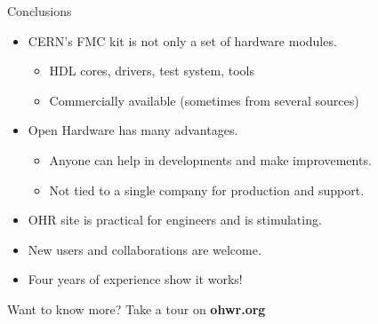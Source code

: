\documentclass[compress,red]{beamer}
\begin{document}
\begin{frame}{Conclusions}

  \begin{block}{}
    \begin{itemize}
    \item CERN's FMC kit is not only a set of hardware modules.
      \begin{itemize}
      \item HDL cores, drivers, test system, tools
      \item Commercially available (sometimes from several sources)
      \end{itemize}
    \item Open Hardware has many advantages.
      \begin{itemize}
      \item Anyone can help in developments and make improvements.
      \item Not tied to a single company for production and support.
      \end{itemize}
    \item OHR site is practical for engineers and is stimulating.
    \item New users and collaborations are welcome.
    \item Four years of experience show it works!
    \end{itemize}
  \end{block}

  \begin{block}{}
    \begin{center}
    Want to know more? Take a tour on \textbf{ohwr.org}
    \end{center}
  \end{block}

  \note[item]{}

\end{frame}





\end{document}
